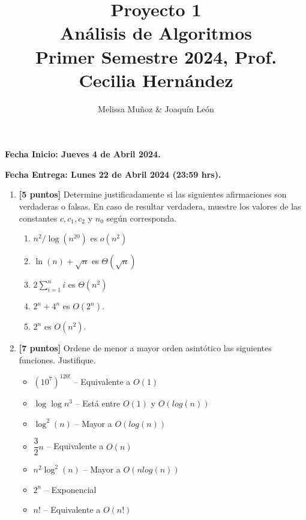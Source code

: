 \documentclass[10pt]{article}
\title{Proyecto 1\\ {\Large Análisis de Algoritmos}\\ {\Large Primer Semestre 2024,} {\large Prof. Cecilia Hernández}}
\date{}
\author{Melissa Muñoz \& Joaquín León}
\begin{document}
\maketitle

 {\bf  Fecha Inicio: Jueves 4 de Abril 2024. }
 
 {\bf Fecha Entrega: Lunes 22 de Abril 2024 (23:59 hrs). }
%


\begin{enumerate}
 \item \textbf{[5 puntos]}
Determine justificadamente si las siguientes afirmaciones son verdaderas o falsas. En caso de resultar verdadera, muestre los valores de las constantes $c,c_1,c_2$ y $n_0$ según corresponda.
\begin{enumerate}
  \item $n^2/\log(n^{20})$ es $o(n^2)$
  \item $\ln(n)+\sqrt{n}$ es $\Theta(\sqrt{n})$
  \item $2\sum_{i=1}^n i$ es $\Theta(n^2)$
  \item $2^n+4^n$ es $O(2^n)$.
  \item $2^n$ es $O(n^2)$.
\end{enumerate}


\item \textbf{[7 puntos]}  Ordene de menor a mayor orden asintótico las siguientes funciones. Justifique.

\begin{itemize}
  \item $(10^7)^{120!}$ \--- Equivalente a $O(1)$

  \item $\log \log n^3$ \--- Está entre $O(1)$ y $O(log(n))$
  \item $\log^2(n)	$   \--- Mayor a $O(log(n))$
  \item $\dfrac{3}{2}n$ \--- Equivalente a $O(n)$
  \item $n^2\log^2(n)$  \--- Mayor a $O(nlog(n))$
  \item $2^n$ 					\--- Exponencial
  \item $n!$            \--- Equivalente a $O(n!)$
\end{itemize}


\end{enumerate}
\end{document}
